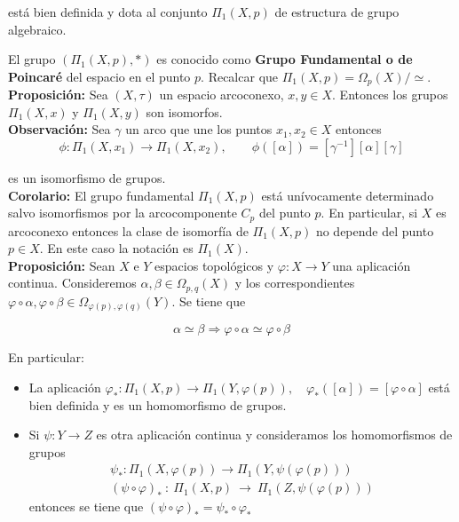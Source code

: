 \documentclass{article}
\begin{document}
está bien definida y dota al conjunto $\Pi_1(X,p)$ de estructura de grupo algebraico.

El grupo $(\Pi_1(X,p),*)$ es conocido como \textbf{Grupo Fundamental o de Poincaré} del espacio en el punto $p$. Recalcar que $\Pi_1(X,p)=\Omega_p(X)/\simeq$.\\

\textbf{Proposición:} Sea $(X,\tau)$ un espacio arcoconexo, $x,y\in X$. Entonces los grupos $\Pi_1(X,x)$ y $\Pi_1(X,y)$ son isomorfos.\\

\textbf{Observación:} Sea $\gamma$ un arco que une los puntos $x_1,x_2\in X$ entonces 
\begin{equation*}
\phi:\Pi_1(X,x_1)\rightarrow \Pi_1(X,x_2),\qquad \phi([\alpha])=[\gamma^{-1}][\alpha][\gamma]
\end{equation*}

es un isomorfismo de grupos. \\

\textbf{Corolario:} El grupo fundamental $\Pi_1(X,p)$ está unívocamente determinado salvo isomorfismos por la arcocomponente $C_p$ del punto $p$. En particular, si $X$ es arcoconexo entonces la clase de isomorfía de $\Pi_1(X,p)$ no depende del punto $p\in X$. En este caso la notación es $\Pi_1(X)$. \\

\textbf{Proposición:} Sean $X$ e $Y$ espacios topológicos y $\varphi:X\rightarrow Y$ una aplicación continua. Consideremos $\alpha,\beta\in \Omega_{p,q}(X)$ y los correspondientes $\varphi\circ\alpha,\varphi\circ\beta\in \Omega_{\varphi(p),\varphi(q)}(Y)$. Se tiene que

\begin{equation*}
\alpha\simeq \beta \Rightarrow \varphi\circ \alpha \simeq \varphi\circ\beta
\end{equation*}

En particular:
\begin{itemize}
\item La aplicación $\varphi_*:\Pi_1(X,p)\rightarrow \Pi_1(Y,\varphi(p)),\quad\varphi_*([\alpha])=[\varphi\circ\alpha]$ está bien definida y es un homomorfismo de grupos.

\item Si $\psi:Y\rightarrow Z$ es otra aplicación continua y consideramos los homomorfismos de grupos 
\begin{gather*}
\psi_*:\Pi_1(X,\varphi(p))\rightarrow \Pi_1(Y,\psi(\varphi(p)))\\(\psi\circ\varphi)_*~:~\Pi_1(X,p)~\rightarrow~\Pi_1(Z,\psi(\varphi(p)))
\end{gather*}
entonces se tiene que $(\psi\circ\varphi)_*=\psi_*\circ\varphi_*$
\end{itemize}
\end{document}
